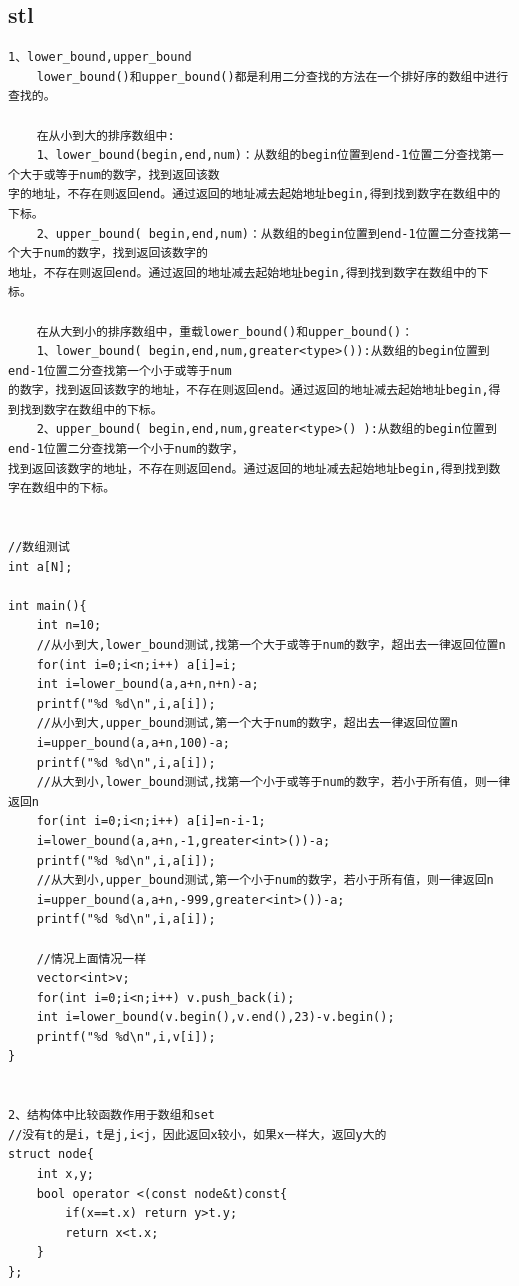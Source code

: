 \documentclass[twoside]{article}
\begin{document}
\subsection{stl}
\begin{lstlisting}
1、lower_bound,upper_bound
	lower_bound()和upper_bound()都是利用二分查找的方法在一个排好序的数组中进行查找的。

	在从小到大的排序数组中:
	1、lower_bound(begin,end,num)：从数组的begin位置到end-1位置二分查找第一个大于或等于num的数字，找到返回该数
字的地址，不存在则返回end。通过返回的地址减去起始地址begin,得到找到数字在数组中的下标。
	2、upper_bound( begin,end,num)：从数组的begin位置到end-1位置二分查找第一个大于num的数字，找到返回该数字的
地址，不存在则返回end。通过返回的地址减去起始地址begin,得到找到数字在数组中的下标。

	在从大到小的排序数组中，重载lower_bound()和upper_bound()：
	1、lower_bound( begin,end,num,greater<type>()):从数组的begin位置到end-1位置二分查找第一个小于或等于num
的数字，找到返回该数字的地址，不存在则返回end。通过返回的地址减去起始地址begin,得到找到数字在数组中的下标。
	2、upper_bound( begin,end,num,greater<type>() ):从数组的begin位置到end-1位置二分查找第一个小于num的数字，
找到返回该数字的地址，不存在则返回end。通过返回的地址减去起始地址begin,得到找到数字在数组中的下标。


//数组测试
int a[N];

int main(){
    int n=10;
    //从小到大,lower_bound测试,找第一个大于或等于num的数字，超出去一律返回位置n
    for(int i=0;i<n;i++) a[i]=i;
    int i=lower_bound(a,a+n,n+n)-a;
    printf("%d %d\n",i,a[i]);
    //从小到大,upper_bound测试,第一个大于num的数字，超出去一律返回位置n
    i=upper_bound(a,a+n,100)-a;
    printf("%d %d\n",i,a[i]);
    //从大到小,lower_bound测试,找第一个小于或等于num的数字，若小于所有值，则一律返回n
    for(int i=0;i<n;i++) a[i]=n-i-1;
    i=lower_bound(a,a+n,-1,greater<int>())-a;
    printf("%d %d\n",i,a[i]);
    //从大到小,upper_bound测试,第一个小于num的数字，若小于所有值，则一律返回n
    i=upper_bound(a,a+n,-999,greater<int>())-a;
    printf("%d %d\n",i,a[i]);

    //情况上面情况一样
    vector<int>v;
    for(int i=0;i<n;i++) v.push_back(i);
    int i=lower_bound(v.begin(),v.end(),23)-v.begin();
    printf("%d %d\n",i,v[i]);
}


2、结构体中比较函数作用于数组和set
//没有t的是i，t是j,i<j，因此返回x较小，如果x一样大，返回y大的
struct node{
    int x,y;
    bool operator <(const node&t)const{
        if(x==t.x) return y>t.y;
        return x<t.x;
    }
};


\end{lstlisting}
\end{document}
